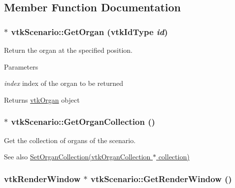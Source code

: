 \subsection{Member Function Documentation}
\hypertarget{classvtkScenario_ab4eab345474f9ad99730b0b3468c514c}{
\subsubsection[{GetOrgan}]{ $\ast$ vtkScenario::GetOrgan (vtkIdType {\em id})}}
\label{classvtkScenario_ab4eab345474f9ad99730b0b3468c514c}


Return the organ at the specified position. 


\begin{DoxyParams}{Parameters}
\item[{\em index}]index of the organ to be returned \end{DoxyParams}
\begin{DoxyReturn}{Returns}
\hyperlink{classvtkOrgan}{vtkOrgan} object 
\end{DoxyReturn}
\hypertarget{classvtkScenario_a9e518be8bb47a65ae2b8a8ef02f579df}{
\subsubsection[{GetOrganCollection}]{ $\ast$ vtkScenario::GetOrganCollection ()}}
\label{classvtkScenario_a9e518be8bb47a65ae2b8a8ef02f579df}


Get the collection of organs of the scenario. 

\begin{DoxySeeAlso}{See also}
\hyperlink{classvtkScenario_afff48d5fa445019c74d0ae9b6cc42376}{SetOrganCollection(vtkOrganCollection $\ast$ collection)} 
\end{DoxySeeAlso}
\hypertarget{classvtkScenario_a4a3cb31864be1da763b5acb3377a32db}{
\subsubsection[{GetRenderWindow}]{\setlength{\rightskip}{0pt plus 5cm}vtkRenderWindow $\ast$ vtkScenario::GetRenderWindow ()}}
\label{classvtkScenario_a4a3cb31864be1da763b5acb3377a32db}


